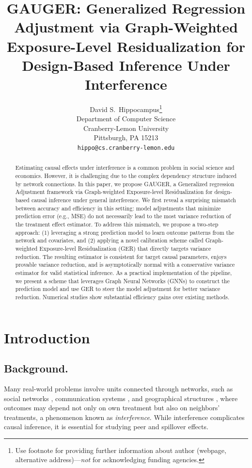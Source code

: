 \documentclass{article}
\title{GAUGER: Generalized Regression Adjustment via Graph-Weighted Exposure-Level Residualization for Design-Based Inference Under Interference}
\author{%
  David S.~Hippocampus\thanks{Use footnote for providing further information
    about author (webpage, alternative address)---\emph{not} for acknowledging
    funding agencies.} \\
  Department of Computer Science\\
  Cranberry-Lemon University\\
  Pittsburgh, PA 15213 \\
  \texttt{hippo@cs.cranberry-lemon.edu} \\
}
\theoremstyle{plain}
\theoremstyle{definition}
\theoremstyle{remark}
\begin{document}
\maketitle


\begin{abstract}
 Estimating causal effects under interference is a common problem in social science and economics. However, it is challenging due to the complex dependency structure induced by network connections. In this paper, we propose GAUGER, a Generalized regression Adjustment framework via Graph-weighted Exposure-level Residualization for design-based causal inference under general interference. We first reveal a surprising mismatch between accuracy and efficiency in this setting: model adjustments that minimize prediction error (e.g., MSE) do not necessarily lead to the most variance reduction of the treatment effect estimator. To address this mismatch, we propose a two-step approach: (1) leveraging a strong prediction model to learn outcome patterns from the network and covariates, and (2) applying a novel calibration scheme called Graph-weighted Exposure-level Residualization (GER) that directly targets variance reduction. The resulting estimator is consistent for target causal parameters, enjoys provable variance reduction, and is asymptotically normal with a conservative variance estimator for valid statistical inference. As a practical implementation of the pipeline, we present a scheme that leverages Graph Neural Networks (GNNs) to construct the prediction model and use GER to steer the model adjustment for better variance reduction. Numerical studies show substantial efficiency gains over existing methods.
\end{abstract}



\section{Introduction}

\subsection{Background.}
Many real-world problems involve units connected through networks, such as social networks \citep{freeman2004development}, communication systems \citep{shaw1964communication}, and geographical structures \citep{rolnick2019randomized}, where outcomes may depend not only on own treatment but also on neighbors’ treatments, a phenomenon known as \emph{interference}. While interference complicates causal inference, it is essential for studying peer and spillover effects.
\end{document}
